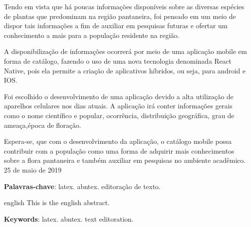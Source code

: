 
\setlength{\absparsep}{18pt} %
\begin{resumo}
	
	Tendo em vista que há poucas informações disponíveis sobre as diversas espécies de plantas que predominam na região pantaneira, foi pensado em um meio de dispor tais informações a fim de auxiliar em pesquisas futuras e ofertar um conhecimento a mais para a população residente na região.
	
	A disponibilização de informações ocorrerá por meio de uma aplicação mobile em forma de catálogo, fazendo o uso de uma nova tecnologia denominada React Native, pois ela permite a criação de aplicativos híbridos, ou seja, para android e IOS.
	
	Foi escolhido o desenvolvimento de uma aplicação devido a alta utilização de aparelhos celulares nos dias atuais. A aplicação irá conter informações gerais como o nome científico e popular, ocorrência, distribuição geográfica, grau de ameaça,época de floração.
	
	Espera-se, que com o desenvolvimento da aplicação, o  catálogo mobile possa contribuir com a população como uma forma de adquirir mais conhecimentos sobre a flora pantaneira e também auxiliar em pesquisas no ambiente acadêmico. 25 de maio de 2019


 \textbf{Palavras-chave}: latex. abntex. editoração de texto.
\end{resumo}

\begin{resumo}[Abstract]
 \begin{otherlanguage*}{english}
   This is the english abstract.

   \vspace{\onelineskip}
 
   \noindent 
   \textbf{Keywords}: latex. abntex. text editoration.
 \end{otherlanguage*}
\end{resumo}